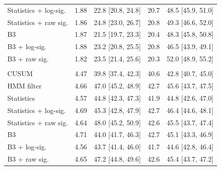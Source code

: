 \begin{tabular}{@{}lcccc@{}}
Statistics + log-sig. & 1.88 & 22.8 [20.8, 24.8] & 20.7 & 48.5 [45.9, 51.0] \\
Statistics + raw sig. & 1.86 & 24.8 [23.0, 26.7] & 20.8 & 49.3 [46.6, 52.0] \\
B3 & 1.87 & 21.5 [19.7, 23.3] & 20.4 & 48.3 [45.8, 50.8] \\
B3 + log-sig. & 1.88 & 23.2 [20.8, 25.5] & 20.8 & 46.5 [43.9, 49.1] \\
B3 + raw sig. & 1.82 & 23.5 [21.4, 25.6] & 20.3 & 52.0 [48.9, 55.2] \\
\addlinespace
\multicolumn{5}{@{}l}{\textit{Target: 5 false alarms per 1,000 observations}} \\
CUSUM & 4.47 & 39.8 [37.4, 42.3] & 40.6 & 42.8 [40.7, 45.0] \\
HMM filter & 4.66 & 47.0 [45.2, 48.9] & 42.7 & 45.6 [43.7, 47.5] \\
Statistics & 4.57 & 44.8 [42.3, 47.3] & 41.9 & 44.8 [42.6, 47.0] \\
Statistics + log-sig. & 4.69 & 45.3 [42.8, 47.9] & 42.7 & 46.4 [44.6, 48.1] \\
Statistics + raw sig. & 4.64 & 48.0 [45.2, 50.9] & 42.6 & 45.5 [43.7, 47.4] \\
B3 & 4.71 & 44.0 [41.7, 46.3] & 42.7 & 45.1 [43.3, 46.9] \\
B3 + log-sig. & 4.56 & 43.7 [41.4, 46.0] & 41.7 & 44.6 [42.8, 46.4] \\
B3 + raw sig. & 4.65 & 47.2 [44.8, 49.6] & 42.6 & 45.4 [43.7, 47.2] \\
\bottomrule
\end{tabular}
